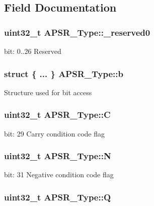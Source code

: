\subsection{Field Documentation}
\hypertarget{unionAPSR__Type_afbce95646fd514c10aa85ec0a33db728}{
\subsubsection[{\-\_\-reserved0}]{\setlength{\rightskip}{0pt plus 5cm}uint32\-\_\-t A\-P\-S\-R\-\_\-\-Type\-::\-\_\-reserved0}}\label{unionAPSR__Type_afbce95646fd514c10aa85ec0a33db728}
bit\-: 0..26 Reserved \hypertarget{unionAPSR__Type_a57fde0b8cbbaaba67bf0fbac8a235126}{
\subsubsection[{b}]{\setlength{\rightskip}{0pt plus 5cm}struct \{ ... \}   A\-P\-S\-R\-\_\-\-Type\-::b}}\label{unionAPSR__Type_a57fde0b8cbbaaba67bf0fbac8a235126}
Structure used for bit access \hypertarget{unionAPSR__Type_a86e2c5b891ecef1ab55b1edac0da79a6}{
\subsubsection[{C}]{\setlength{\rightskip}{0pt plus 5cm}uint32\-\_\-t A\-P\-S\-R\-\_\-\-Type\-::\-C}}\label{unionAPSR__Type_a86e2c5b891ecef1ab55b1edac0da79a6}
bit\-: 29 Carry condition code flag \hypertarget{unionAPSR__Type_a7e7bbba9b00b0bb3283dc07f1abe37e0}{
\subsubsection[{N}]{\setlength{\rightskip}{0pt plus 5cm}uint32\-\_\-t A\-P\-S\-R\-\_\-\-Type\-::\-N}}\label{unionAPSR__Type_a7e7bbba9b00b0bb3283dc07f1abe37e0}
bit\-: 31 Negative condition code flag \hypertarget{unionAPSR__Type_a22d10913489d24ab08bd83457daa88de}{
\subsubsection[{Q}]{\setlength{\rightskip}{0pt plus 5cm}uint32\-\_\-t A\-P\-S\-R\-\_\-\-Type\-::\-Q}}\label{unionAPSR__Type_a22d10913489d24ab08bd83457daa88de}
